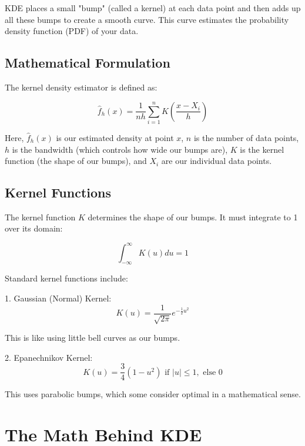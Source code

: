 \documentclass[conference]{IEEEtran}
\begin{document}
KDE places a small "bump" (called a kernel) at each data point and then adds up all these bumps to create a smooth curve. This curve estimates the probability density function (PDF) of your data.

\subsection{Mathematical Formulation}

The kernel density estimator is defined as:

\begin{equation}
    \hat{f}_h(x) = \frac{1}{nh} \sum_{i=1}^n K\left(\frac{x - X_i}{h}\right)
\end{equation}

Here, $\hat{f}_h(x)$ is our estimated density at point $x$, $n$ is the number of data points, $h$ is the bandwidth (which controls how wide our bumps are), $K$ is the kernel function (the shape of our bumps), and $X_i$ are our individual data points.

\subsection{Kernel Functions}

The kernel function $K$ determines the shape of our bumps. It must integrate to 1 over its domain:

\begin{equation}
    \int_{-\infty}^{\infty} K(u) du = 1
\end{equation}

Standard kernel functions include:

1. Gaussian (Normal) Kernel:
\begin{equation}
    K(u) = \frac{1}{\sqrt{2\pi}} e^{-\frac{1}{2}u^2}
\end{equation}

This is like using little bell curves as our bumps.

2. Epanechnikov Kernel:
\begin{equation}
    K(u) = \frac{3}{4}(1-u^2) \text{ if } |u|\leq 1, \text{ else } 0
\end{equation}

This uses parabolic bumps, which some consider optimal in a mathematical sense.

\section{The Math Behind KDE}
\end{document}
